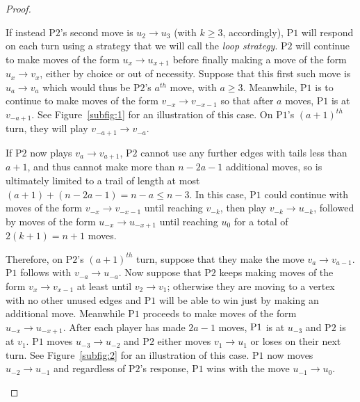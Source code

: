 \documentclass{article}
\theoremstyle{plain}
\theoremstyle{definition}
\def\pone{{\rm{P}\ensuremath{1}}}
\def\ptwo{{\rm{P}\ensuremath{2}}}
\def\poneposs{{\rm{P}\ensuremath{1}'s}}
\def\ptwoposs{{\rm{P}\ensuremath{2}'s}}
\begin{document}
\begin{proof}
\begin{itemize}
If instead \ptwoposs{} second move is $u_{2}\to u_{3}$ (with $k \ge 3$, accordingly), \pone{} will respond on each turn using a strategy that we will call the \emph{loop strategy}. \ptwo{} will continue to make moves of the form $u_{x}\to u_{x+1}$ before finally making a move of the form $u_{x}\to v_{x}$, either by choice or out of necessity. Suppose that this first such move is $u_{a}\to v_{a}$ which would thus be \ptwoposs{} $a^{th}$ move, with $a\ge 3$. Meanwhile, \pone{} is to continue to make moves of the form $v_{-x}\to v_{-x-1}$ so that after $a$ moves, \pone{} is at $v_{-a+1}$. See Figure~\ref{subfig:1} for an illustration of this case. On \poneposs{} $(a+1)^{th}$ turn, they will play $v_{-a+1}\to v_{-a}$.

If \ptwo{} now plays $v_{a}\to v_{a+1}$, \ptwo{} cannot use any further edges with tails less than $a+1$, and thus cannot make more than $n-2a-1$ additional moves, so is ultimately limited to a trail of length at most $(a+1)+(n-2a-1)=n-a\le n-3$. In this case, \pone{} could continue with moves of the form $v_{-x}\to v_{-x-1}$ until reaching $v_{-k}$, then play $v_{-k}\to u_{-k}$, followed by moves of the form $u_{-x}\to u_{-x+1}$ until reaching $u_0$ for a total of $2(k+1) = n+1$ moves. 

Therefore, on \ptwoposs{} $(a+1)^{th}$ turn, suppose that they make the move $v_{a}\to v_{a-1}$. \pone{} follows with $v_{-a}\to u_{-a}$. Now suppose that \ptwo{} keeps making moves of the form $v_{x}\to v_{x-1}$ at least until $v_{2}\to v_{1}$; otherwise they are moving to a vertex with no other unused edges and \pone{} will be able to win just by making an additional move. Meanwhile \pone{} proceeds to make moves of the form $u_{-x}\to u_{-x+1}$. After each player has made $2a-1$ moves, $\pone{}$ is at $u_{-3}$ and \ptwo{} is at $v_{1}$. \pone{} moves $u_{-3}\to u_{-2}$ and \ptwo{} either moves $v_{1}\to u_{1}$ or loses on their next turn. See Figure~\ref{subfig:2} for an illustration of this case. \pone{} now moves $u_{-2}\to u_{-1}$ and regardless of \ptwoposs{} response, \pone{} wins with the move $u_{-1}\to u_0$.


\end{itemize}
\end{proof}
\end{document}
